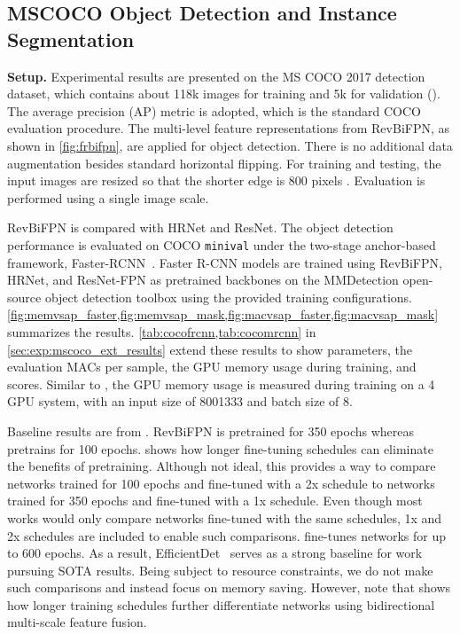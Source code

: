 \documentclass{article}
\begin{document}
\subsection{MSCOCO Object Detection and Instance Segmentation}
\label{sec:exp:coco}

\textbf{Setup.} Experimental results are presented on the MS COCO 2017 detection dataset, which contains about 118k images for training and 5k for validation ().
The average precision (AP) metric is adopted, which is the standard COCO evaluation procedure.
The multi-level feature representations from RevBiFPN, as shown in \cref{fig:frbifpn}, are applied for object detection.
There is no additional data augmentation besides standard horizontal flipping.
For training and testing, the input images are resized so that the shorter edge is 800 pixels \cite{lin2017feature}.
Evaluation is performed using a single image scale.

RevBiFPN is compared with HRNet and ResNet.
The object detection performance is evaluated on COCO \texttt{minival} under the two-stage anchor-based framework, Faster-RCNN~\cite{ren2015faster}.
Faster R-CNN models are trained using RevBiFPN, HRNet, and ResNet-FPN as pretrained backbones on the MMDetection open-source object detection toolbox \cite{chen2019mmdetection} using the provided training configurations. 
\cref{fig:memvsap_faster,fig:memvsap_mask,fig:macvsap_faster,fig:macvsap_mask} summarizes the results.
\cref{tab:cocofrcnn,tab:cocomrcnn} in \cref{sec:exp:mscoco_ext_results} extend these results to show parameters, the evaluation MACs per sample,
the GPU memory usage during training, and scores.
Similar to \citet{sun2019hrnet_pose}, the GPU memory usage is measured during training on a 4 GPU system, with an input size of 8001333 and batch size of 8.

Baseline results are from \citet{wang2020hrnet}.
RevBiFPN is pretrained for 350 epochs whereas \citet{wang2020hrnet} pretrains for 100 epochs.
\citet{he2019rethinking} shows how longer fine-tuning schedules can eliminate the benefits of pretraining.
Although not ideal, this provides a way to compare networks trained for 100 epochs and fine-tuned with a 2x schedule to networks trained for 350 epochs and fine-tuned with a 1x schedule.
Even though most works would only compare networks fine-tuned with the same schedules, 1x and 2x schedules are included to enable such comparisons. 
\citet{tan2020efficientdet} fine-tunes networks for up to 600 epochs.
As a result, EfficientDet~\cite{tan2020efficientdet} serves as a strong baseline for work pursuing SOTA results.
Being subject to resource constraints, we do not make such comparisons and instead focus on memory saving. However, note that \citet{tan2020efficientdet} shows how longer training schedules further differentiate networks using bidirectional multi-scale feature fusion.
\end{document}
